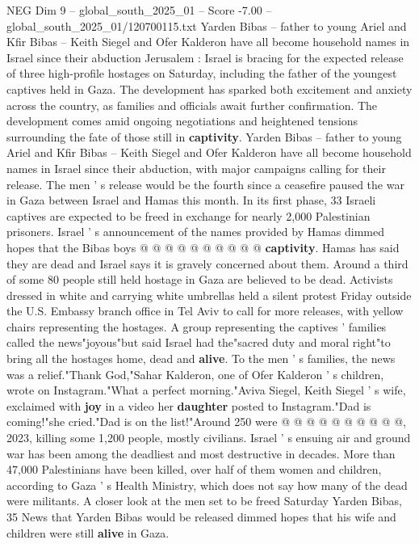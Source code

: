 \begin{textsample}{NEG Dim 9 – global\_south\_2025\_01 – Score -7.00 – global\_south\_2025\_01/120700115.txt}  \label{ex:f9_neg_137}
Yarden Bibas -- father to young Ariel and Kfir Bibas -- Keith Siegel and Ofer Kalderon have all become household names in Israel since their abduction Jerusalem : Israel is bracing for the expected release of three high-profile hostages on Saturday, including the father of the youngest captives held in Gaza.
The development has sparked both excitement and anxiety across the country, as families and officials await further confirmation.
The development comes amid ongoing negotiations and heightened tensions surrounding the fate of those still in \textbf{captivity}.
Yarden Bibas -- father to young Ariel and Kfir Bibas -- Keith Siegel and Ofer Kalderon have all become household names in Israel since their abduction, with major campaigns calling for their release.
The men ' s release would be the fourth since a ceasefire paused the war in Gaza between Israel and Hamas this month.
In its first phase, 33 Israeli captives are expected to be freed in exchange for nearly 2,000 Palestinian prisoners.
Israel ' s announcement of the names provided by Hamas dimmed hopes that the Bibas boys @ @ @ @ @ @ @ @ @ @ \textbf{captivity}.
Hamas has said they are dead and Israel says it is gravely concerned about them.
Around a third of some 80 people still held hostage in Gaza are believed to be dead.
Activists dressed in white and carrying white umbrellas held a silent protest Friday outside the U.S.
Embassy branch office in Tel Aviv to call for more releases, with yellow chairs representing the hostages.
A group representing the captives ' families called the news"joyous"but said Israel had the"sacred duty and moral right"to bring all the hostages home, dead and \textbf{alive}.
To the men ' s families, the news was a relief."Thank God,"Sahar Kalderon, one of Ofer Kalderon ' s children, wrote on Instagram."What a perfect morning."Aviva Siegel, Keith Siegel ' s wife, exclaimed with \textbf{joy} in a video her \textbf{daughter} posted to Instagram."Dad is coming!"she cried."Dad is on the list!"Around 250 were @ @ @ @ @ @ @ @ @ @, 2023, killing some 1,200 people, mostly civilians.
Israel ' s ensuing air and ground war has been among the deadliest and most destructive in decades.
More than 47,000 Palestinians have been killed, over half of them women and children, according to Gaza ' s Health Ministry, which does not say how many of the dead were militants.
A closer look at the men set to be freed Saturday Yarden Bibas, 35 News that Yarden Bibas would be released dimmed hopes that his wife and children were still \textbf{alive} in Gaza.

\end{textsample}
